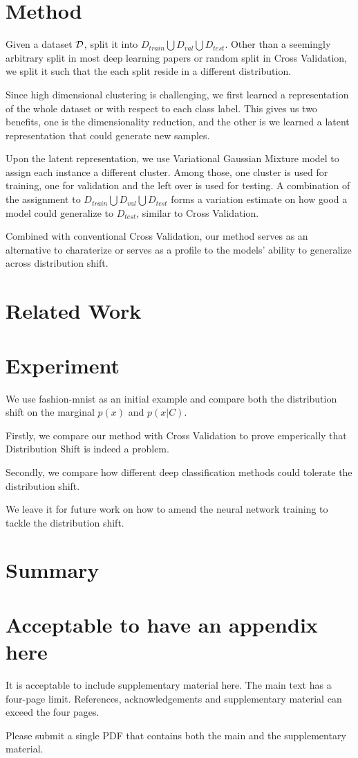 \documentclass{article}
\begin{document}
\section{Method}
Given a dataset $\mathcal{D}$, split it into $D_{train} \bigcup D_{val} \bigcup D_{test}$. Other than a seemingly arbitrary split in most deep learning papers or random split in Cross Validation, we split it such that the each split reside in a different distribution.

Since high dimensional clustering is challenging, we first learned a representation of the whole dataset or with respect to each class label. This gives us two benefits, one is the dimensionality reduction, and the other is we learned a latent representation that could generate new samples.

Upon the latent representation, we use Variational Gaussian Mixture model to assign each instance a different cluster. Among those, one cluster is used for training, one for validation and the left over is used for testing. A combination of the assignment to $D_{train} \bigcup D_{val} \bigcup D_{test}$ forms a variation estimate on how good a model could generalize to $D_{test}$, similar to Cross Validation.

Combined with conventional Cross Validation, our method serves as an alternative to charaterize or serves as a profile to the models' ability to generalize across distribution shift.
 
\section{Related Work}
\section{Experiment}
We use fashion-mnist \cite{FIXME} as an initial example and compare both the distribution shift on the marginal $p(x)$ and $p(x|C)$. 

Firstly, we compare our method with Cross Validation to prove emperically that Distribution Shift is indeed  a problem.

Secondly, we compare how different deep classification methods could tolerate the distribution shift.

We leave it for future work on how to amend the neural network training to tackle the distribution shift.
\section{Summary}




\appendix
\section{Acceptable to have an appendix here}
It is acceptable to include supplementary material here. 
The main text has a four-page limit. References, acknowledgements and supplementary material can exceed the four pages. 

Please submit a single PDF that contains both the main and the supplementary material. 
\end{document}
